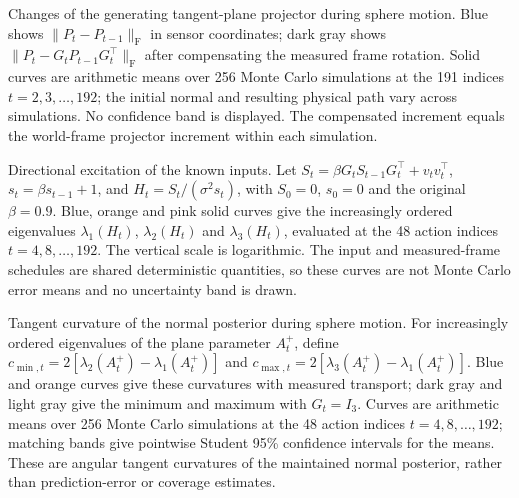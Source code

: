 \caption{Changes of the generating tangent-plane projector during sphere motion. Blue shows $\|P_t-P_{t-1}\|_{\mathrm F}$ in sensor coordinates; dark gray shows $\|P_t-G_tP_{t-1}G_t^\top\|_{\mathrm F}$ after compensating the measured frame rotation. Solid curves are arithmetic means over 256 Monte Carlo simulations at the 191 indices $t=2,3,\ldots,192$; the initial normal and resulting physical path vary across simulations. No confidence band is displayed. The compensated increment equals the world-frame projector increment within each simulation.}

\caption{Directional excitation of the known inputs. Let $S_t=\beta G_tS_{t-1}G_t^\top+v_tv_t^\top$, $s_t=\beta s_{t-1}+1$, and $H_t=S_t/(\sigma^2s_t)$, with $S_0=0$, $s_0=0$ and the original $\beta=0.9$. Blue, orange and pink solid curves give the increasingly ordered eigenvalues $\lambda_1(H_t)$, $\lambda_2(H_t)$ and $\lambda_3(H_t)$, evaluated at the 48 action indices $t=4,8,\ldots,192$. The vertical scale is logarithmic. The input and measured-frame schedules are shared deterministic quantities, so these curves are not Monte Carlo error means and no uncertainty band is drawn.}

\caption{Tangent curvature of the normal posterior during sphere motion. For increasingly ordered eigenvalues of the plane parameter $A_t^+$, define $c_{\min,t}=2[\lambda_2(A_t^+)-\lambda_1(A_t^+)]$ and $c_{\max,t}=2[\lambda_3(A_t^+)-\lambda_1(A_t^+)]$. Blue and orange curves give these curvatures with measured transport; dark gray and light gray give the minimum and maximum with $G_t=I_3$. Curves are arithmetic means over 256 Monte Carlo simulations at the 48 action indices $t=4,8,\ldots,192$; matching bands give pointwise Student 95\% confidence intervals for the means. These are angular tangent curvatures of the maintained normal posterior, rather than prediction-error or coverage estimates.}
